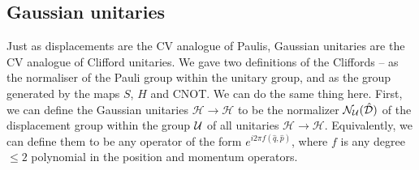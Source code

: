 \subsection{Gaussian unitaries}

Just as displacements are the CV analogue of Paulis, Gaussian unitaries are the CV analogue of Clifford unitaries.
We gave two definitions of the Cliffords -- as the normaliser of the Pauli group within the unitary group, and as the group generated by the maps $S$, $H$ and CNOT.
We can do the same thing here.
First, we can define the Gaussian unitaries $\mathcal{H} \to \mathcal{H}$ to be the normalizer $\mathcal{N}_{\mathcal{U}}(\hat{\mathcal{D}})$ of the displacement group within the group $\mathcal{U}$ of all unitaries $\mathcal{H} \to \mathcal{H}$.
Equivalently, we can define them to be any operator of the form $e^{i2\pi f(\hat{q}, \hat{p})}$, where $f$ is any degree $\leq 2$ polynomial in the position and momentum operators.